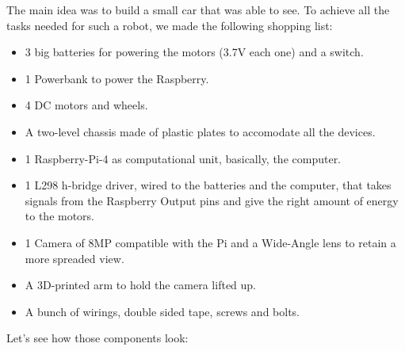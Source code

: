 \documentclass[12pt,a4paper]{article}
\begin{document}
\begin{large}
The main idea was to build a small car that was able to see. To achieve all the tasks needed for such a robot, we made the following shopping list: 
\begin{itemize}
  \item 3 big batteries for powering the motors (3.7V each one) and a switch.
  \item 1 Powerbank to power the Raspberry.
  \item 4 DC motors and wheels.
  \item A two-level chassis made of plastic plates to accomodate all the devices.
  \item 1 Raspberry-Pi-4 as computational unit, basically, the computer.
  \item 1 L298 h-bridge driver, wired to the batteries and the computer, that takes signals from the Raspberry Output pins and give the right amount of energy to the motors.
  \item 1 Camera of 8MP compatible with the Pi and a Wide-Angle lens to retain a more spreaded view.
  \item A 3D-printed arm to hold the camera lifted up.
  \item A bunch of wirings, double sided tape, screws and bolts.
\end{itemize}
Let's see how those components look: 


\end{large}
\end{document}
